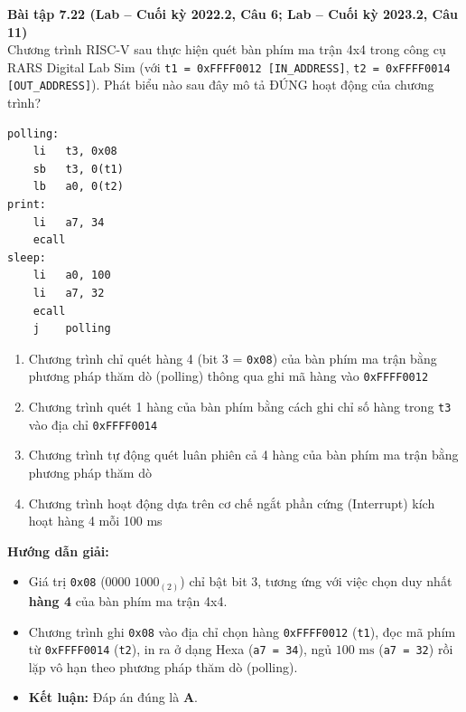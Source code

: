 \textbf{Bài tập 7.22 (Lab -- Cuối kỳ 2022.2, Câu 6; Lab -- Cuối kỳ 2023.2, Câu 11)}\\
Chương trình RISC-V sau thực hiện quét bàn phím ma trận 4x4 trong công cụ RARS Digital Lab Sim (với \texttt{t1 = 0xFFFF0012 [IN\_ADDRESS]}, \texttt{t2 = 0xFFFF0014 [OUT\_ADDRESS]}). Phát biểu nào sau đây mô tả ĐÚNG hoạt động của chương trình?
\begin{lstlisting}
polling:
    li   t3, 0x08
    sb   t3, 0(t1)
    lb   a0, 0(t2)
print:
    li   a7, 34
    ecall
sleep:
    li   a0, 100
    li   a7, 32
    ecall
    j    polling
\end{lstlisting}
\begin{enumerate}[label=\Alph*.]
    \item Chương trình chỉ quét hàng 4 (bit 3 = \texttt{0x08}) của bàn phím ma trận bằng phương pháp thăm dò (polling) thông qua ghi mã hàng vào \texttt{0xFFFF0012}
    \item Chương trình quét 1 hàng của bàn phím bằng cách ghi chỉ số hàng trong \texttt{t3} vào địa chỉ \texttt{0xFFFF0014}
    \item Chương trình tự động quét luân phiên cả 4 hàng của bàn phím ma trận bằng phương pháp thăm dò
    \item Chương trình hoạt động dựa trên cơ chế ngắt phần cứng (Interrupt) kích hoạt hàng 4 mỗi 100 ms
\end{enumerate}
\textbf{Hướng dẫn giải:}
\begin{itemize}
    \item Giá trị \texttt{0x08} ($0000\;1000_{(2)}$) chỉ bật bit 3, tương ứng với việc chọn duy nhất \textbf{hàng 4} của bàn phím ma trận 4x4.
    \item Chương trình ghi \texttt{0x08} vào địa chỉ chọn hàng \texttt{0xFFFF0012} (\texttt{t1}), đọc mã phím từ \texttt{0xFFFF0014} (\texttt{t2}), in ra ở dạng Hexa (\texttt{a7 = 34}), ngủ $100\text{ ms}$ (\texttt{a7 = 32}) rồi lặp vô hạn theo phương pháp thăm dò (polling).
    \item \textbf{Kết luận:} Đáp án đúng là \textbf{A}.
\end{itemize}
